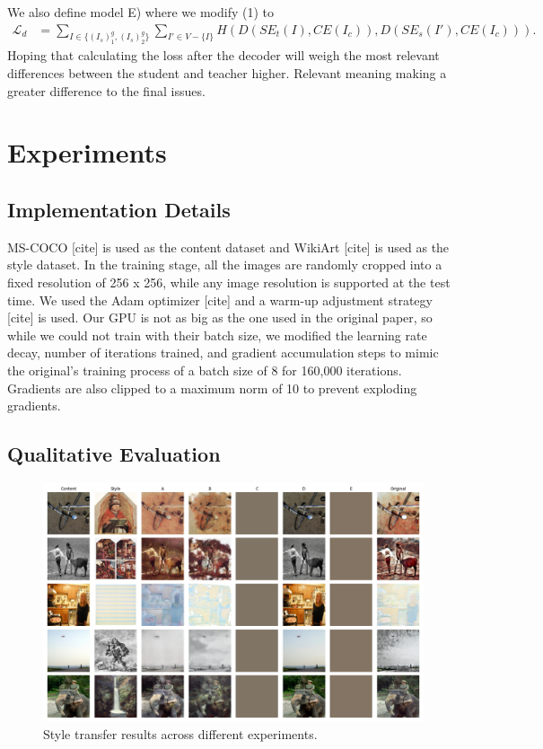 \documentclass{article}
\begin{document}
We also define model E) where we modify (1) to
\begin{align}
	\mathcal L_d &= \sum_{I \in \{(I_s)^g_1, (I_s)^g_2\}} \sum_{I' \in V - \{ I \}} H(D(SE_t(I), CE(I_c)), D(SE_s(I'), CE(I_c))).
\end{align}
Hoping that calculating the loss after the decoder will weigh the most relevant differences between the student and teacher higher. Relevant meaning making a greater difference to the final issues.

\section{Experiments}

\subsection{Implementation Details}

MS-COCO [cite] is used as the content dataset and WikiArt [cite] is used as the style dataset. In the training stage,
all the images are randomly cropped into a fixed resolution of 256 x 256, while any image resolution is supported at the test time. We used the Adam optimizer [cite] and a warm-up adjustment strategy [cite] is used. Our GPU is not as big as the one used in the original paper, so while we could not train with their batch size, we modified the learning rate decay, number of iterations trained, and gradient accumulation steps to mimic the original's training process of a batch size of 8 for 160,000 iterations. Gradients are also clipped to a maximum norm of 10 to prevent exploding gradients.

\subsection{Qualitative Evaluation}

\begin{center}
\begin{figure}
\includegraphics[width=14cm]{comparison}	
\caption{Style transfer results across different experiments.}
\label{comparison}
\end{figure}
\end{center}
\end{document}
